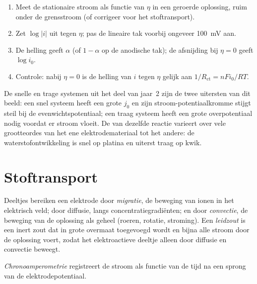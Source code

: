 \begin{method}\label{met:b3:electrode-kinetics:tafel-analysis}
\begin{enumerate}
  \item Meet de stationaire stroom als functie van $\eta$ in een geroerde
        oplossing, ruim onder de grensstroom (of corrigeer voor het
        stoftransport).
  \item Zet $\log|i|$ uit tegen $\eta$; pas de lineaire tak voorbij
        ongeveer \qty{100}{mV} aan.
  \item De helling geeft $\alpha$ (of $1 - \alpha$ op de anodische tak); de
        afsnijding bij $\eta = 0$ geeft $\log i_0$.
  \item Controle: nabij $\eta = 0$ is de helling van $i$ tegen $\eta$ gelijk
        aan $1/R_{\mathrm{ct}} = nFi_0/RT$.
\end{enumerate}
\end{method}

De snelle en trage systemen uit het deel van jaar~2 zijn de twee
uitersten van dit beeld: een snel systeem heeft een grote $j_0$ en zijn
stroom-potentiaalkromme stijgt steil bij de evenwichtspotentiaal; een
traag systeem heeft een grote overpotentiaal nodig voordat er stroom
vloeit. De  van dezelfde reactie varieert over
vele grootteordes van het ene elektrodemateriaal tot het andere: de
waterstofontwikkeling is snel op platina en uiterst traag op kwik.

\section{Stoftransport}

\begin{definition}\label{def:b3:electrode-kinetics:transport}
Deeltjes bereiken een elektrode door \emph{migratie}, de
beweging van ionen in het elektrisch veld; door diffusie, langs
concentratiegradiënten; en door \emph{convectie}, de
beweging van de oplossing als geheel (roeren, rotatie, stroming). Een
\emph{leidzout}
is een inert zout dat in grote overmaat toegevoegd wordt en bijna alle
stroom door de oplossing voert, zodat het elektroactieve deeltje alleen
door diffusie en convectie beweegt.
\end{definition}

\begin{definition}[Chronoamperometrie]\label{def:b3:electrode-kinetics:chronoamperometry}
\emph{Chronoamperometrie} registreert de stroom
als functie van de tijd na een sprong van de elektrodepotentiaal.
\end{definition}

